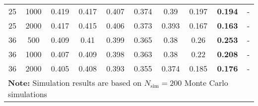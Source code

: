 \begin{landscape}
\begin{table}[!h]
\begin{tabular}{cccccccccc}
	 25  & 1000 &         0.419         &                 0.417                 &                      0.407                       &                     0.374                      &                       0.39                       &          0.197           & \textbf{0.194}             & -                 \\
	 25  & 2000 &         0.417         &                 0.415                 &                      0.406                       &                     0.373                      &                      0.393                       &          0.167           & \textbf{0.163}             & -                 \\
	 36  & 500  &         0.409         &                 0.41                  &                      0.399                       &                     0.365                      &                       0.38                       &           0.26           & \textbf{0.253}             & -                 \\
	 36  & 1000 &         0.407         &                 0.409                 &                      0.398                       &                     0.363                      &                       0.38                       &           0.22           & \textbf{0.208}             & -                 \\
	 36  & 2000 &         0.405         &                 0.408                 &                      0.393                       &                     0.355                      &                      0.374                       &          0.185           & \textbf{0.176}             & -                 \\
	\hline
	\hline
    \multicolumn{10}{l}{\textbf{Note:} Simulation results are based on $N_\text{sim} = 200$ Monte Carlo simulations}
    \end{tabular}
    \end{table}
    \egroup
\end{landscape}
    